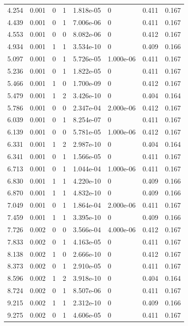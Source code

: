 \documentclass[preview]{standalone}
\begin{document}
{{\begin{tabular}{L{1.2cm}C{1.2cm} C{0.3cm}C{0.5cm} C{1.4cm}C{1.4cm} C{1.4cm}C{1.4cm}}
  4.254  &  0.001  & 0     &  1 &  1.818e-05  & 0  & 0.411 &  0.167   \\ 
  4.439  &  0.001  & 0     &  1 &  7.006e-06  & 0  & 0.411 &  0.167   \\ 
  4.553  &  0.001  & 0     &  0 &  8.082e-06  & 0  & 0.412 &  0.167   \\ 
  4.934  &  0.001  & 1     &  1 &  3.534e-10  & 0  & 0.409 &  0.166   \\ 
  5.097  &  0.001  & 0     &  1 &  5.726e-05  & 1.000e-06  & 0.411 &  0.167   \\ 
  5.236  &  0.001  & 0     &  1 &  1.822e-05  & 0  & 0.411 &  0.167   \\ 
  5.466  &  0.001  & 1     &  0 &  1.700e-09  & 0  & 0.412 &  0.167   \\ 
  5.479  &  0.001  & 1     &  2 &  3.426e-10  & 0  & 0.404 &  0.164   \\ 
  5.786  &  0.001  & 0     &  0 &  2.347e-04  & 2.000e-06  & 0.412 &  0.167   \\ 
  6.039  &  0.001  & 0     &  1 &  8.254e-07  & 0  & 0.411 &  0.167   \\ 
  6.139  &  0.001  & 0     &  0 &  5.781e-05  & 1.000e-06  & 0.412 &  0.167   \\ 
  6.331  &  0.001  & 1     &  2 &  2.987e-10  & 0  & 0.404 &  0.164   \\ 
  6.341  &  0.001  & 0     &  1 &  1.566e-05  & 0  & 0.411 &  0.167   \\ 
  6.713  &  0.001  & 0     &  1 &  1.044e-04  & 1.000e-06  & 0.411 &  0.167   \\ 
  6.830  &  0.001  & 1     &  1 &  4.220e-10  & 0  & 0.409 &  0.166   \\ 
  6.870  &  0.001  & 1     &  1 &  4.832e-10  & 0  & 0.409 &  0.166   \\ 
  7.049  &  0.001  & 0     &  1 &  1.864e-04  & 2.000e-06  & 0.411 &  0.167   \\ 
  7.459  &  0.001  & 1     &  1 &  3.395e-10  & 0  & 0.409 &  0.166   \\ 
  7.726  &  0.002  & 0     &  0 &  3.566e-04  & 4.000e-06  & 0.412 &  0.167   \\ 
  7.833  &  0.002  & 0     &  1 &  4.163e-05  & 0  & 0.411 &  0.167   \\ 
  8.138  &  0.002  & 1     &  0 &  2.666e-10  & 0  & 0.412 &  0.167   \\ 
  8.373  &  0.002  & 0     &  1 &  2.910e-05  & 0  & 0.411 &  0.167   \\ 
  8.596  &  0.002  & 1     &  2 &  3.918e-10  & 0  & 0.404 &  0.164   \\ 
  8.724  &  0.002  & 0     &  1 &  8.507e-06  & 0  & 0.411 &  0.167   \\ 
  9.215  &  0.002  & 1     &  1 &  2.312e-10  & 0  & 0.409 &  0.166   \\ 
  9.275  &  0.002  & 0     &  1 &  4.606e-05  & 0  & 0.411 &  0.167   \\ 
\hline 
\end{tabular} 

}}
\end{document}
